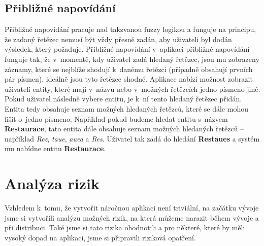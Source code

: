 \subsection{Přibližné napovídání}
\par Přibližné napovídání pracuje nad takzvanou fuzzy logikou a funguje na principu, že zadaný řetězec nemusí být vždy přesně zadán, aby uživateli byl dodán výsledek, který požaduje. Přibližné napovídání v~aplikaci přibližné napovídání funguje tak, že v~momentě, kdy uživatel zadá hledaný řetězec, jsou mu zobrazeny záznamy, které se nejblíže shodují k~danému řetězci (případně obsahují prvních pár písmen), ideálně jsou tyto řetězce shodné. Aplikace nabízí možnost zobrazit uživateli entity, které mají v~názvu nebo v~možných řetězcích jedno písmeno jiné. Pokud uživatel následně vybere entitu, je k~ní tento hledaný řetězec přidán. Entita tedy obsahuje seznam možných hledaných řetězců, které se dále mohou lišit o~jedno písmeno. Například pokud budeme hledat entitu s~názvem \textbf{Restaurace}, tato entita dále obsahuje seznam možných hledaných řetězců -- například \textit{Rez}, \textit{taue}, \textit{auea} a \textit{Res}. Uživatel tak zadá do hledání \textbf{Restaues} a systém mu nabídne entitu \textbf{Restaurace}.

\section{Analýza rizik}
\par Vzhledem k~tomu, že vytvořit náročnou aplikaci není triviální, na začátku vývoje jsme si vytvořili analýzu možných rizik, na která můžeme narazit během vývoje a při distribuci. Také jsme si tato rizika ohodnotili a pro některé, které by měli vysoký dopad na aplikaci, jsme si připravili riziková opatření.

